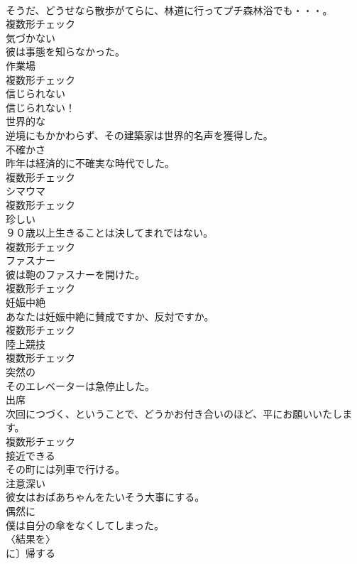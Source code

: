 \documentclass[8pt]{extreport}
\begin{document}
\begin{CJK}{UTF8}{min}
\\	そうだ、どうせなら散歩がてらに、林道に行ってプチ森林浴でも・・・。	
\\	複数形チェック
\\	[形容詞]	気づかない	
\\	彼は事態を知らなかった。	
\\	[名詞]	作業場	
\\	複数形チェック
\\	[形容詞]	信じられない	
\\	信じられない！	
\\	[形容詞]	世界的な	
\\	逆境にもかかわらず、その建築家は世界的名声を獲得した。	
\\	[名詞]	不確かさ	
\\	昨年は経済的に不確実な時代でした。	
\\	複数形チェック
\\	[名詞]	シマウマ	
\\	複数形チェック
\\	[名詞]	珍しい	
\\	９０歳以上生きることは決してまれではない。	
\\	複数形チェック
\\	[名詞]	ファスナー	
\\	彼は鞄のファスナーを開けた。	
\\	複数形チェック
\\	[名詞]	妊娠中絶	
\\	あなたは妊娠中絶に賛成ですか、反対ですか。	
\\	複数形チェック
\\	[名詞]	陸上競技	
\\	複数形チェック
\\	[形容詞]	突然の	
\\	そのエレベーターは急停止した。	
\\	[名詞]	出席	
\\	次回につづく、ということで、どうかお付き合いのほど、平にお願いいたします。	
\\	複数形チェック
\\	[形容詞]	接近できる	
\\	その町には列車で行ける。	
\\	[形容詞]	注意深い	
\\	彼女はおばあちゃんをたいそう大事にする。	
\\	[副詞]	偶然に	
\\	僕は自分の傘をなくしてしまった。	
\\	[動詞]	〈結果を〉
\\	に〕帰する	

\end{CJK}
\end{document}
